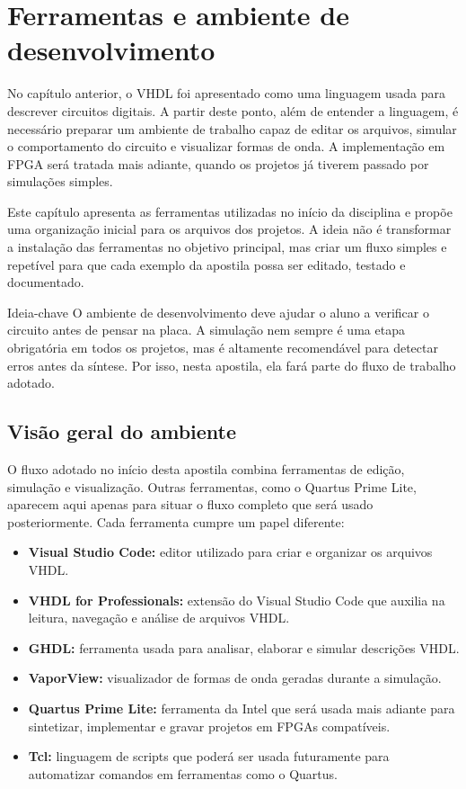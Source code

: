 \chapter{Ferramentas e ambiente de desenvolvimento}

No capítulo anterior, o VHDL foi apresentado como uma linguagem usada para descrever circuitos digitais. A partir deste ponto, além de entender a linguagem, é necessário preparar um ambiente de trabalho capaz de editar os arquivos, simular o comportamento do circuito e visualizar formas de onda. A implementação em FPGA será tratada mais adiante, quando os projetos já tiverem passado por simulações simples.

Este capítulo apresenta as ferramentas utilizadas no início da disciplina e propõe uma organização inicial para os arquivos dos projetos. A ideia não é transformar a instalação das ferramentas no objetivo principal, mas criar um fluxo simples e repetível para que cada exemplo da apostila possa ser editado, testado e documentado.

\begin{observacao}{Ideia-chave}
O ambiente de desenvolvimento deve ajudar o aluno a verificar o circuito antes de pensar na placa. A simulação nem sempre é uma etapa obrigatória em todos os projetos, mas é altamente recomendável para detectar erros antes da síntese. Por isso, nesta apostila, ela fará parte do fluxo de trabalho adotado.
\end{observacao}

\section{Visão geral do ambiente}

O fluxo adotado no início desta apostila combina ferramentas de edição, simulação e visualização. Outras ferramentas, como o Quartus Prime Lite, aparecem aqui apenas para situar o fluxo completo que será usado posteriormente. Cada ferramenta cumpre um papel diferente:

\begin{itemize}
    \item \textbf{Visual Studio Code:} editor utilizado para criar e organizar os arquivos VHDL.
    \item \textbf{VHDL for Professionals:} extensão do Visual Studio Code que auxilia na leitura, navegação e análise de arquivos VHDL.
    \item \textbf{GHDL:} ferramenta usada para analisar, elaborar e simular descrições VHDL.
    \item \textbf{VaporView:} visualizador de formas de onda geradas durante a simulação.
    \item \textbf{Quartus Prime Lite:} ferramenta da Intel que será usada mais adiante para sintetizar, implementar e gravar projetos em FPGAs compatíveis.
    \item \textbf{Tcl:} linguagem de scripts que poderá ser usada futuramente para automatizar comandos em ferramentas como o Quartus.
\end{itemize}

